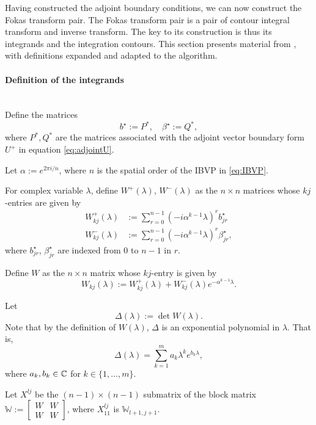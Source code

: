 \documentclass[12pt, oneside, a4paper]{article}
\begin{document}
Having constructed the adjoint boundary conditions, we can now construct the Fokas transform pair. The Fokas transform pair is a pair of contour integral transform and inverse transform. The key to its construction is thus its integrands and the integration contours. This section presents material from \cite{Smith2016}, with definitions expanded and adapted to the algorithm.

\paragraph{Definition of the integrands}\label{sec:integrand_defn}\mbox{}\\
Define the matrices 
\[b^\star := P^*,\quad \beta^\star := Q^*,\]
where $P^*, Q^*$ are the matrices associated with the adjoint vector boundary form $U^+$ in equation \ref{eq:adjointU}.

Let $\alpha := e^{2\pi i/n}$, where $n$ is the spatial order of the IBVP in \eqref{eq:IBVP}. 

For complex variable $\lambda$, define $W^+(\lambda)$, $W^-(\lambda)$ as the $n\times n$ matrices whose $kj$-entries are given by
\begin{subequations}\label{eq:M+/-}
    \begin{align}
        W^+_{kj}(\lambda) &:= \sum_{r=0}^{n-1}(-i\alpha^{k-1}\lambda)^r b^\star_{jr}\label{eq:M+}\\
        W^-_{kj}(\lambda) &:= \sum_{r=0}^{n-1}(-i\alpha^{k-1}\lambda)^r \beta^\star_{jr},\label{eq:M-}
    \end{align}
\end{subequations}
where $b^\star_{jr}$, $\beta^\star_{jr}$ are indexed from $0$ to $n-1$ in $r$. 

Define $W$ as the $n\times n$ matrix whose $kj$-entry is given by
\begin{equation}\label{eq:M}
    W_{kj}(\lambda) := W^+_{kj}(\lambda) + W^-_{kj}(\lambda)e^{-\alpha^{k-1}\lambda}.
\end{equation}

Let
\begin{equation}\label{eq:delta}
    \Delta(\lambda):=\det W(\lambda).
\end{equation}
Note that by the definition of $W(\lambda)$, $\Delta$ is an exponential polynomial in $\lambda$. That is,
\[\Delta(\lambda) = \sum_{k=1}^m a_k \lambda^k e^{b_k\lambda},\]
where $a_k, b_k\in\mathbb C$ for $k\in\{1,\ldots,m\}$.

Let $X^{lj}$ be the $(n-1)\times (n-1)$ submatrix of the block matrix $\mathbb{W}:=\begin{bmatrix}W & W\\ W & W\end{bmatrix}$, where $X^{lj}_{11}$ is $\mathbb{W}_{l+1, j+1}$.
\end{document}
